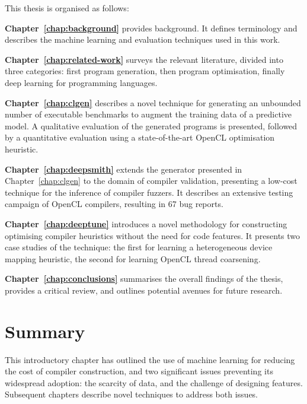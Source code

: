This thesis is organised as follows:

\textbf{Chapter~\ref{chap:background}} provides background. It defines terminology and describes the machine learning and evaluation techniques used in this work.

\textbf{Chapter~\ref{chap:related-work}} surveys the relevant literature, divided into three categories: first program generation, then program optimisation, finally deep learning for programming languages.

\textbf{Chapter~\ref{chap:clgen}} describes a novel technique for generating an unbounded number of executable benchmarks to augment the training data of a predictive model. A qualitative evaluation of the generated programs is presented, followed by a quantitative evaluation using a state-of-the-art OpenCL optimisation heuristic.

\textbf{Chapter~\ref{chap:deepsmith}} extends the generator presented in Chapter~\ref{chap:clgen} to the domain of compiler validation, presenting a low-cost technique for the inference of compiler fuzzers. It describes an extensive testing campaign of OpenCL compilers, resulting in 67 bug reports.

\textbf{Chapter~\ref{chap:deeptune}} introduces a novel methodology for constructing optimising compiler heuristics without the need for code features. It presents two case studies of the technique: the first for learning a heterogeneous device mapping heuristic, the second for learning OpenCL thread coarsening.

\textbf{Chapter~\ref{chap:conclusions}} summarises the overall findings of the thesis, provides a critical review, and outlines potential avenues for future research.


\section{Summary}

This introductory chapter has outlined the use of machine learning for reducing the cost of compiler construction, and two significant issues preventing its widespread adoption: the scarcity of data, and the challenge of designing features. Subsequent chapters describe novel techniques to address both issues.
